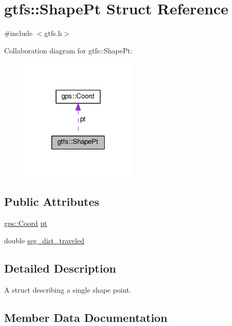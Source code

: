 \hypertarget{structgtfs_1_1ShapePt}{}\section{gtfs\+:\+:Shape\+Pt Struct Reference}
\label{structgtfs_1_1ShapePt}


{\ttfamily \#include $<$gtfs.\+h$>$}



Collaboration diagram for gtfs\+:\+:Shape\+Pt\+:
\nopagebreak
\begin{figure}[H]
\begin{center}
\leavevmode
\includegraphics[width=157pt]{structgtfs_1_1ShapePt__coll__graph}
\end{center}
\end{figure}
\subsection*{Public Attributes}
\begin{DoxyCompactItemize}
\item 
\hyperlink{classgps_1_1Coord}{gps\+::\+Coord} \hyperlink{structgtfs_1_1ShapePt_ab79eb8263213afd27be9b257fca8515a}{pt}
\item 
double \hyperlink{structgtfs_1_1ShapePt_ad3fe477575279af15fe33e0ce36eaad2}{seg\+\_\+dist\+\_\+traveled}
\end{DoxyCompactItemize}


\subsection{Detailed Description}
A struct describing a single shape point. 

\subsection{Member Data Documentation}
\mbox{\label{structgtfs_1_1ShapePt_ab79eb8263213afd27be9b257fca8515a}} 
